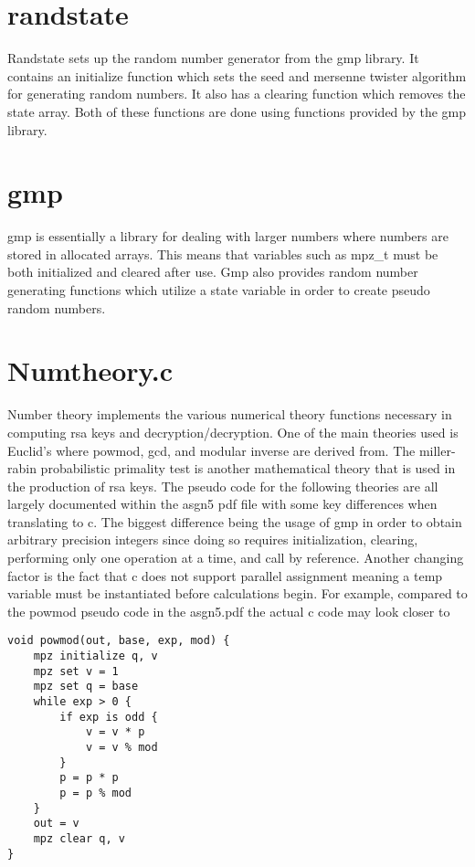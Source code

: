 \documentclass[11pt]{article}
\begin{document}
\section{randstate}
Randstate sets up the random number generator from the gmp library. It contains an initialize function which sets the seed and mersenne twister algorithm for generating random numbers. It also has a clearing function which removes the state array. Both of these functions are done using functions provided by the gmp library.

\section{gmp}
gmp is essentially a library for dealing with larger numbers where numbers are stored in allocated arrays. This means that variables such as mpz\_t must be both initialized and cleared after use. Gmp also provides random number generating functions which utilize a state variable in order to create pseudo random numbers.

\section{Numtheory.c}
Number theory implements the various numerical theory functions necessary in computing rsa keys and decryption/decryption. One of the main theories used is Euclid's where powmod, gcd, and modular inverse are derived from. The miller-rabin probabilistic primality test is another mathematical theory that is used in the production of rsa keys. The pseudo code for the following theories are all largely documented within the asgn5 pdf file with some key differences when translating to c. The biggest difference being the usage of gmp in order to obtain arbitrary precision integers since doing so requires initialization, clearing, performing only one operation at a time, and call by reference. Another changing factor is the fact that c does not support parallel assignment meaning a temp variable must be instantiated before calculations begin. For example, compared to the powmod pseudo code in the asgn5.pdf the actual c code may look closer to 

\begin{verbatim}
void powmod(out, base, exp, mod) {
    mpz initialize q, v
    mpz set v = 1
    mpz set q = base
    while exp > 0 {
        if exp is odd {
            v = v * p
            v = v % mod
        }
        p = p * p
        p = p % mod
    }
    out = v
    mpz clear q, v
}
\end{verbatim}
\end{document}
